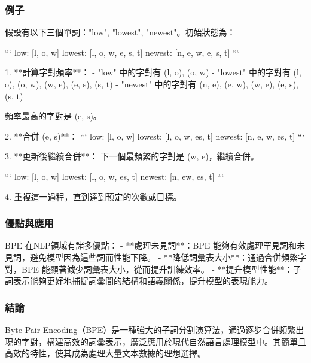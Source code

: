 \subsubsection{例子}
假設有以下三個單詞："low", "lowest", "newest"。初始狀態為：

```
low: [l, o, w]
lowest: [l, o, w, e, s, t]
newest: [n, e, w, e, s, t]
```

1. **計算字對頻率**：
   - "low" 中的字對有 (l, o), (o, w)
   - "lowest" 中的字對有 (l, o), (o, w), (w, e), (e, s), (s, t)
   - "newest" 中的字對有 (n, e), (e, w), (w, e), (e, s), (s, t)

   頻率最高的字對是 (e, s)。

2. **合併 (e, s)**：
   ```
   low: [l, o, w]
   lowest: [l, o, w, es, t]
   newest: [n, e, w, es, t]
   ```

3. **更新後繼續合併**：
   下一個最頻繁的字對是 (w, e)，繼續合併。

   ```
   low: [l, o, w]
   lowest: [l, o, w, es, t]
   newest: [n, ew, es, t]
   ```

4. 重複這一過程，直到達到預定的次數或目標。

\subsubsection{優點與應用}
BPE 在NLP領域有諸多優點：
- **處理未見詞**：BPE 能夠有效處理罕見詞和未見詞，避免模型因為這些詞而性能下降。
- **降低詞彙表大小**：通過合併頻繁字對，BPE 能顯著減少詞彙表大小，從而提升訓練效率。
- **提升模型性能**：子詞表示能夠更好地捕捉詞彙間的結構和語義關係，提升模型的表現能力。

\subsubsection{結論}
Byte Pair Encoding（BPE）是一種強大的子詞分割演算法，通過逐步合併頻繁出現的字對，構建高效的詞彙表示，廣泛應用於現代自然語言處理模型中。其簡單且高效的特性，使其成為處理大量文本數據的理想選擇。
